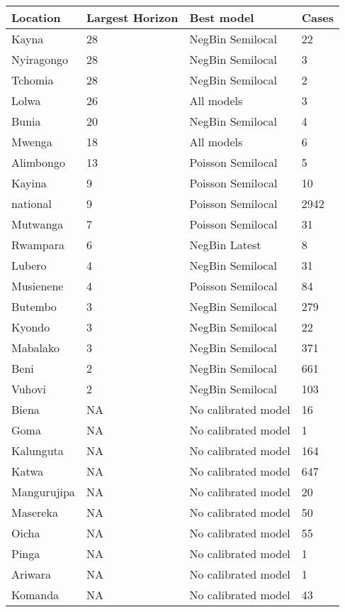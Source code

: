 \begin{table}[h!]
\centering
\begin{tabular}{|l|l|l|l|}
  \hline
Location & Largest Horizon & Best model & Cases \\ 
  \hline
Kayna & 28 & NegBin Semilocal & 22 \\ 
  Nyiragongo & 28 & NegBin Semilocal & 3 \\ 
  Tchomia & 28 & NegBin Semilocal & 2 \\ 
  Lolwa & 26 & All models & 3 \\ 
  Bunia & 20 & NegBin Semilocal & 4 \\ 
  Mwenga & 18 & All models & 6 \\ 
  Alimbongo & 13 & Poisson Semilocal & 5 \\ 
  Kayina & 9 & Poisson Semilocal & 10 \\ 
  national & 9 & Poisson Semilocal & 2942 \\ 
  Mutwanga & 7 & Poisson Semilocal & 31 \\ 
  Rwampara & 6 & NegBin Latest & 8 \\ 
  Lubero & 4 & NegBin Semilocal & 31 \\ 
  Musienene & 4 & Poisson Semilocal & 84 \\ 
  Butembo & 3 & NegBin Semilocal & 279 \\ 
  Kyondo & 3 & NegBin Semilocal & 22 \\ 
  Mabalako & 3 & NegBin Semilocal & 371 \\ 
  Beni & 2 & NegBin Semilocal & 661 \\ 
  Vuhovi & 2 & NegBin Semilocal & 103 \\ 
  Biena & NA & No calibrated model & 16 \\ 
  Goma & NA & No calibrated model & 1 \\ 
  Kalunguta & NA & No calibrated model & 164 \\ 
  Katwa & NA & No calibrated model & 647 \\ 
  Mangurujipa & NA & No calibrated model & 20 \\ 
  Masereka & NA & No calibrated model & 50 \\ 
  Oicha & NA & No calibrated model & 55 \\ 
  Pinga & NA & No calibrated model & 1 \\ 
  Ariwara & NA & No calibrated model & 1 \\ 
  Komanda & NA & No calibrated model & 43 \\ 

\end{tabular}
\end{table}
